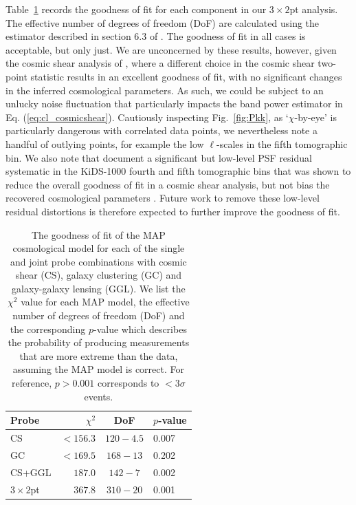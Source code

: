 Table~\ref{tab:goodness-of-fit} records the goodness of fit for each component in our $3\times2$pt analysis.  The effective number of degrees of freedom (DoF) are calculated using the estimator described in section 6.3 of \citet{joachimi/etal:inprep}.   The goodness of fit in all cases is acceptable, but only just.    We are unconcerned by these results, however, given the cosmic shear analysis of \citet{asgari/etal:inprep}, where a different choice in the cosmic shear two-point statistic results in an excellent goodness of fit, with no significant changes in the inferred cosmological parameters.    As such, we could be subject to an unlucky noise fluctuation that particularly impacts the band power estimator in Eq. (\ref{eq:cl_cosmicshear}).  Cautiously inspecting Fig.~\ref{fig:Pkk}, as `$\chi$-by-eye' is particularly dangerous with correlated data points, we nevertheless note a handful of outlying points, for example the low $\ell$-scales in the fifth tomographic bin.   We also note that \citet{giblin/etal:inprep} document a significant but low-level PSF residual systematic in the KiDS-1000 fourth and fifth tomographic bins that was shown to reduce the overall goodness of fit in a cosmic shear analysis, but not bias the recovered cosmological parameters \citep[see also the discussion in][]{amara/refregier:2008}.  Future work to remove these low-level residual distortions is therefore expected to further improve the goodness of fit.

\begin{table}
	\begin{center}
		\caption{The goodness of fit of the MAP cosmological model for each of the single and joint probe combinations with cosmic shear (CS), galaxy clustering (GC) and galaxy-galaxy lensing (GGL).   We list the $\chi^2$ value for each MAP model, the effective number of degrees of freedom (DoF) and the corresponding $p$-value which describes the probability of producing measurements that are more extreme than the data, assuming the MAP model is correct.   For reference, $p > 0.001$ corresponds to $<3\sigma$ events.}
		\label{tab:goodness-of-fit}
\begin{tabular}{lrcl}
    \toprule
    Probe             & $\chi^2$       & DoF       & $p$-value   \\
    \midrule
	CS               & $< 156.3$ & $120-4.5$ & 0.007 \\
	GC               & $< 169.5$ & $168-13$ & 0.202 \\
	CS+GGL           & $187.0$ & $142-7$ & 0.002 \\
	$3\times2$pt            & $367.8$ & $310-20$ & 0.001 \\

    \bottomrule
\end{tabular}
	\end{center}
\end{table}

